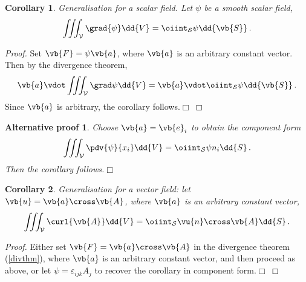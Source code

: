 \documentclass{article}
\theoremstyle{plain}\theoremheaderfont{\normalfont\itshape}\theorembodyfont{\rmfamily}\theoremseparator{.}\newtheorem*{rem}{Remark}\newtheorem*{ex}{Example}\newtheorem*{proof}{Proof}\newtheorem*{altp}{Alternative proof}
\theoremstyle{plain}\theoremheaderfont{\normalfont\bfseries}\theorembodyfont{\rmfamily}\theoremseparator{.}\newtheorem{thm}{Theorem}[section]\newtheorem{lem}[thm]{Lemma}\newtheorem{prop}[thm]{Proposition}\newtheorem*{cor}{Corollary}\newtheorem{defn}[thm]{Definition}\newtheorem{clm}[thm]{Claim}\newtheorem{clminproof}{Claim}
\theoremstyle{break}\theoremheaderfont{\normalfont\itshape}\theorembodyfont{\rmfamily}\theoremseparator{.\medskip}\newtheorem*{proofskip}{Proof}\newtheorem*{exs}{Examples}\newtheorem*{rems}{Remarks}
\theoremstyle{break}\theoremheaderfont{\normalfont\bfseries}\theorembodyfont{\rmfamily}\theoremseparator{.\medskip}\newtheorem{lemskip}[thm]{Lemma}\newtheorem{defnskip}[thm]{Definition}\newtheorem{propskip}[thm]{Proposition}\newtheorem{thmskip}[thm]{Theorem}
\numberwithin{equation}{section}
\newcommand{\qed}{\hfill\ensuremath{\Box}}
\begin{document}
	\begin{cor}
		Generalisation for a scalar field. Let \(\psi\) be a smooth scalar field,
		\[\iiint_{\mathcal{V}}\grad{\psi}\dd{V}=\oiint_{\mathcal{S}}\psi\dd{\vb{S}}\,.\]
	\end{cor}
	\begin{proof}
		Set \(\vb{F}=\psi\vb{a}\), where \(\vb{a}\) is an arbitrary constant vector. Then by the divergence theorem,
		\[\vb{a}\vdot\iiint_\mathcal{V}\grad\psi\dd{V}=\vb{a}\vdot\oiint_\mathcal{S}\psi\dd{\vb{S}}\,.\]
		Since \(\vb{a}\) is arbitrary, the corollary follows.\qed
	\end{proof}
	\begin{altp}
		Choose \(\vb{a}=\vb{e}_i\) to obtain the component form
		\[\iiint_\mathcal{V}\pdv{\psi}{x_i}\dd{V}=\oiint_\mathcal{S}\psi n_i\dd{S}\,.\]
		Then the corollary follows.\qed
	\end{altp}
	\begin{cor}
		Generalisation for a vector field: let \(\vb{u}=\vb{a}\cross\vb{A}\), where \(\vb{a}\) is an arbitrary constant vector,
		\[\iiint_{\mathcal{V}}\curl{\vb{A}}\dd{V}=\oiint_{\mathcal{S}}\vu{n}\cross\vb{A}\dd{S}\,.\]
	\end{cor}
	\begin{proof}
		Either set \(\vb{F}=\vb{a}\cross\vb{A}\) in the divergence theorem (\cref{divthm}), where \(\vb{a}\) is an arbitrary constant vector, and then proceed as above, or let \(\psi=\varepsilon_{ijk}A_j\) to recover the corollary in component form.\qed
	\end{proof}
	
\end{document}
